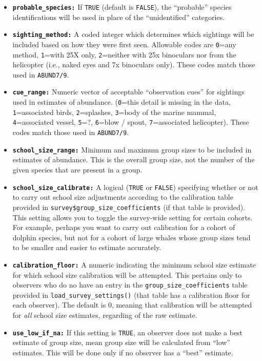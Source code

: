 \documentclass[
]{book}
\begin{document}
\begin{itemize}
\item
  \textbf{\texttt{probable\_species:}} If \texttt{TRUE} (default is \texttt{FALSE}), the ``probable'' species identifications will be used in place of the ``unidentified'' categories.
\item
  \textbf{\texttt{sighting\_method:}} A coded integer which determines which sightings will be included based on how they were first seen. Allowable codes are \texttt{0}=any method, \texttt{1}=with 25X only, \texttt{2}=neither with 25x binoculars nor from the helicopter (i.e., naked eyes and 7x binoculars only). These codes match those used in \texttt{ABUND7/9}.
\item
  \textbf{\texttt{cue\_range:}} Numeric vector of acceptable ``observation cues'' for sightings used in estimates of abundance. (\texttt{0}=this detail is missing in the data, \texttt{1}=associated birds, \texttt{2}=splashes, \texttt{3}=body of the marine mammal, \texttt{4}=associated vessel, \texttt{5}=?, \texttt{6}=blow / spout, \texttt{7}=associated helicopter). These codes match those used in \texttt{ABUND7/9}.
\item
  \textbf{\texttt{school\_size\_range:}} Minimum and maximum group sizes to be included in estimates of abundance. This is the overall group size, not the number of the given species that are present in a group.
\item
  \textbf{\texttt{school\_size\_calibrate:}} A logical (\texttt{TRUE} or \texttt{FALSE}) specifying whether or not to carry out school size adjustments according to the calibration table provided in \texttt{survey\$group\_size\_coefficients} (if that table is provided). This setting allows you to toggle the survey-wide setting for certain cohorts. For example, perhaps you want to carry out calibration for a cohort of dolphin species, but not for a cohort of large whales whose group sizes tend to be smaller and easier to estimate accurately.
\item
  \textbf{\texttt{calibration\_floor:}} A numeric indicating the minimum school size estimate for which school size calibration will be attempted. This pertains only to observers who do no have an entry in the \texttt{group\_size\_coefficients} table provided in \texttt{load\_survey\_settings()} (that table has a calibration floor for each observer). The default is 0, meaning that calibration will be attempted for \emph{all} school size estimates, regarding of the raw estimate.
\item
  \textbf{\texttt{use\_low\_if\_na:}} If this setting is \texttt{TRUE}, an observer does not make a best estimate of group size, mean group size will be calculated from ``low'' estimates. This will be done only if no observer has a ``best'' estimate.

\end{itemize}
\end{document}
